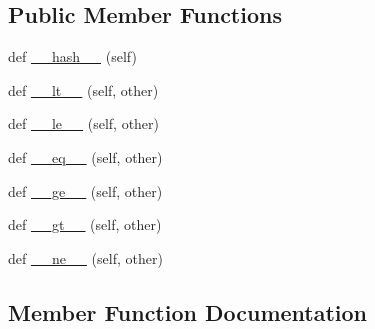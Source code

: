 \subsection*{Public Member Functions}
\begin{DoxyCompactItemize}
\item 
def \hyperlink{classsetuptools_1_1__vendor_1_1packaging_1_1version_1_1__BaseVersion_a56134266800f740720c3209ea5284586}{\+\_\+\+\_\+hash\+\_\+\+\_\+} (self)
\item 
def \hyperlink{classsetuptools_1_1__vendor_1_1packaging_1_1version_1_1__BaseVersion_a6b30200919d1f89d2ab98607f1e5b3bf}{\+\_\+\+\_\+lt\+\_\+\+\_\+} (self, other)
\item 
def \hyperlink{classsetuptools_1_1__vendor_1_1packaging_1_1version_1_1__BaseVersion_a5cffa6a46c9d06cff6706bc814e8123e}{\+\_\+\+\_\+le\+\_\+\+\_\+} (self, other)
\item 
def \hyperlink{classsetuptools_1_1__vendor_1_1packaging_1_1version_1_1__BaseVersion_af48e2f9cb763dccb458a4d0b9a23f1a3}{\+\_\+\+\_\+eq\+\_\+\+\_\+} (self, other)
\item 
def \hyperlink{classsetuptools_1_1__vendor_1_1packaging_1_1version_1_1__BaseVersion_a1540bb23ab0a359c40020118eba60407}{\+\_\+\+\_\+ge\+\_\+\+\_\+} (self, other)
\item 
def \hyperlink{classsetuptools_1_1__vendor_1_1packaging_1_1version_1_1__BaseVersion_a177dc7a3808df42256904d188848b824}{\+\_\+\+\_\+gt\+\_\+\+\_\+} (self, other)
\item 
def \hyperlink{classsetuptools_1_1__vendor_1_1packaging_1_1version_1_1__BaseVersion_aff0afe8376f116afd936dc82be92a60e}{\+\_\+\+\_\+ne\+\_\+\+\_\+} (self, other)
\end{DoxyCompactItemize}


\subsection{Member Function Documentation}
\mbox{\label{classsetuptools_1_1__vendor_1_1packaging_1_1version_1_1__BaseVersion_af48e2f9cb763dccb458a4d0b9a23f1a3}} 
